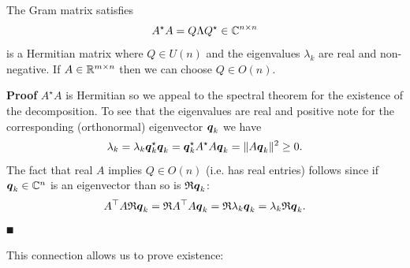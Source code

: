 \begin{proposition} The Gram matrix satisfies
\[
A^\star A = Q \Lambda Q^\star \in {\mathbb C}^{n \times n}
\]
is a Hermitian matrix where $Q \ensuremath{\in} U(n)$ and the eigenvalues $\ensuremath{\lambda}_k$ are real and non-negative. If $A \in {\mathbb R}^{m \times n}$ then we can choose $Q \ensuremath{\in} O(n)$.

\end{proposition}
\textbf{Proof} $A^\ensuremath{\star} A$ is Hermitian so we appeal to the spectral theorem for the existence of the decomposition.  To see that the eigenvalues are real and positive  note for the corresponding (orthonormal) eigenvector $\bm{{\mbox{\boldmath$q$\unboldmath}}}_k$ we have
\[
\lambda_k = \lambda_k \bm{{\mbox{\boldmath$q$\unboldmath}}}_k^\star \bm{{\mbox{\boldmath$q$\unboldmath}}}_k = \bm{{\mbox{\boldmath$q$\unboldmath}}}_k^\star A^\star A \bm{{\mbox{\boldmath$q$\unboldmath}}}_k = \| A \bm{{\mbox{\boldmath$q$\unboldmath}}}_k \|^2 \geq 0.
\]
The fact that real $A$  implies $Q \ensuremath{\in} O(n)$ (i.e. has real entries) follows since if $\bm{{\mbox{\boldmath$q$\unboldmath}}}_k \in {\mathbb C}^n$ is an eigenvector than so is $\mathfrak{R} \bm{{\mbox{\boldmath$q$\unboldmath}}}_k$:
\[
A^\top A \mathfrak{R} \bm{{\mbox{\boldmath$q$\unboldmath}}}_k = \mathfrak{R} A^\top A  \bm{{\mbox{\boldmath$q$\unboldmath}}}_k  = \mathfrak{R} \lambda_k \bm{{\mbox{\boldmath$q$\unboldmath}}}_k = \lambda_k \mathfrak{R} \bm{{\mbox{\boldmath$q$\unboldmath}}}_k.
\]
\ensuremath{\QED}

This connection allows us to prove existence:

